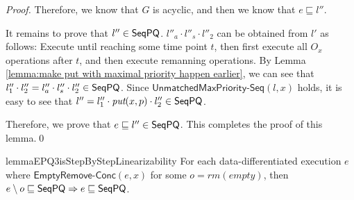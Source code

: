 \begin {proof}
Therefore, we know that $G$ is acyclic, and then we know that $e \sqsubseteq l''$.

It remains to prove that $l'' \in \mathsf{SeqPQ}$. $l''_a \cdot l''_s \cdot l''_2$ can be obtained from $l'$ as follows: Execute until reaching some time point $t$, then first execute all $O_x$ operations after $t$, and then execute remanning operations. By Lemma \ref{lemma:make put with maximal priority happen earlier}, we can see that $l''_1 \cdot l''_2 = l''_a \cdot l''_s \cdot l''_2 \in \mathsf{SeqPQ}$. Since $\mathsf{UnmatchedMaxPriority\text{-}Seq}(l,x)$ holds, it is easy to see that $l'' = l''_1 \cdot \textit{put}(x,p) \cdot l''_2 \in \mathsf{SeqPQ}$.

Therefore, we prove that $e \sqsubseteq l'' \in \mathsf{SeqPQ}$. This completes the proof of this lemma.\qed
\end {proof}


\begin{restatable}{lemma}{EPQ3isStepByStepLinearizability}
\label{lemma:EPQ3 is step-by-step linearizability}
For each data-differentiated execution $e$ where $\mathsf{EmptyRemove}\mathsf{\text{-}Conc}(e,x)$ for some $o=\textit{rm}(\textit{empty})$, then $e \setminus o \sqsubseteq \mathsf{SeqPQ} \Rightarrow e \sqsubseteq \mathsf{SeqPQ}$.
\end{restatable}

